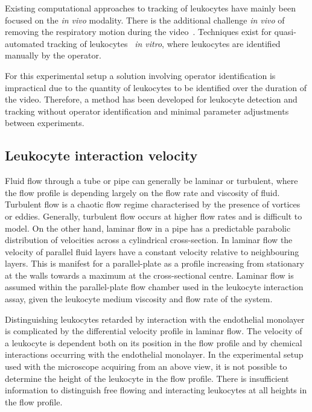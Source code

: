 Existing computational approaches to tracking of leukocytes have mainly been focused on the \emph{in vivo} modality. There is the additional challenge \emph{in vivo} of removing the respiratory motion during the video~\cite{Ray2002,Sperandio2006}. Techniques exist for quasi-automated tracking of leukocytes~\cite{Acton2002, Debeir2005} \emph{in vitro}, where leukocytes are identified manually by the operator.

For this experimental setup a solution involving operator identification is impractical due to the quantity of leukocytes to be identified over the duration of the video. Therefore, a method has been developed for leukocyte detection and tracking without operator identification and minimal parameter adjustments between experiments.

\subsection{Leukocyte interaction velocity}
\label{leukocytes:introduction:velocity}
Fluid flow through a tube or pipe can generally be laminar or turbulent, where the flow profile is depending largely on the flow rate and viscosity of fluid. Turbulent flow is a chaotic flow regime characterised by the presence of vortices or eddies. Generally, turbulent flow occurs at higher flow rates and is difficult to model. On the other hand, laminar flow in a pipe has a predictable parabolic distribution of velocities across a cylindrical cross-section. In laminar flow the velocity of parallel fluid layers have a constant velocity relative to neighbouring layers. This is manifest for a parallel-plate as a profile increasing from stationary at the walls towards a maximum at the cross-sectional centre. Laminar flow is assumed within the parallel-plate flow chamber used in the leukocyte interaction assay, given the leukocyte medium viscosity and flow rate of the system.

Distinguishing leukocytes retarded by interaction with the endothelial monolayer is complicated by the differential velocity profile in laminar flow. The velocity of a leukocyte is dependent both on its position in the flow profile and by chemical interactions occurring with the endothelial monolayer. In the experimental setup used with the microscope acquiring from an above view, it is not possible to determine the height of the leukocyte in the flow profile. There is insufficient information to distinguish free flowing and interacting leukocytes at all heights in the flow profile. 

